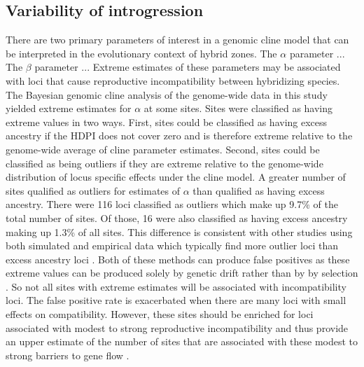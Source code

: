 \subsection{Variability of introgression}
There are two primary parameters of interest in a genomic cline model that 
can be interpreted in the evolutionary context of hybrid zones.
The $\alpha$ parameter ...
The $\beta$ parameter ...
Extreme estimates of these parameters may be associated with loci that cause  
reproductive incompatibility between hybridizing species. 
The Bayesian genomic cline analysis of the genome-wide data in this study yielded extreme 
estimates for $\alpha$ at some sites.
Sites were classified as having extreme values in two ways. 
First, sites could be classified as having excess ancestry if the HDPI does not cover
zero and is therefore extreme relative to the genome-wide average of cline 
parameter estimates.
Second, sites could be classified as being outliers if they are extreme relative  
to the genome-wide distribution of locus specific effects under the cline model.
A greater number of sites qualified as outliers for estimates of $\alpha$ than 
qualified as having excess ancestry.
There were 116 loci classified as outliers which make up 9.7\% of the total 
number of sites.
Of those, 16 were also classified as having excess ancestry making up 1.3\% of all sites.
This difference is consistent with other studies using both simulated and 
empirical data which typically find more outlier loci than excess ancestry loci \parencite{gompert2012,}. 
Both of these methods can produce false positives as these extreme values can
be produced solely by genetic drift rather than by by selection \parencite{gompert2012}. 
So not all sites with extreme estimates will be associated with incompatibility loci. 
The false positive rate is exacerbated when there are many loci with small 
effects on compatibility. 
However, these sites should be enriched for loci associated with modest to strong 
reproductive incompatibility and thus provide an upper estimate of the number of 
sites that are associated with these modest to strong barriers to gene flow \parencite{gompert2012}. 

